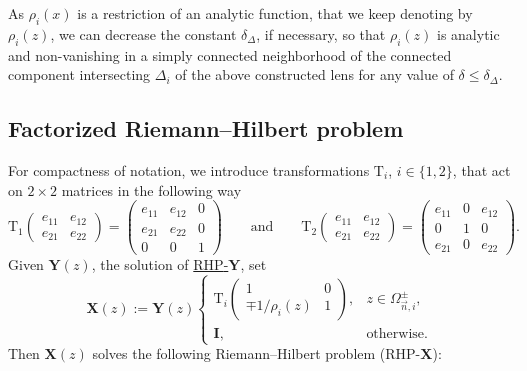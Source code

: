 \documentclass[pdftex]{sigma}
\numberwithin{equation}{section}
\newcommand{\n}{{\vec n}}
\newcommand{\rhy} {\textnormal{RHP}-${\boldsymbol Y}$}
\newcommand{\rhx} {\textnormal{RHP}-${\boldsymbol X}$}
\begin{document}
As $ \rho_i(x) $ is a restriction of an analytic function, that we keep denoting by $ \rho_i(z) $, we can decrease the constant $ \delta_\Delta $, if necessary, so that $ \rho_i(z) $ is analytic and non-vanishing in a simply connected neighborhood of the connected component intersecting $ \Delta_i $ of the above constructed lens for any value of $ \delta\leq\delta_\Delta $.

\subsection{Factorized Riemann--Hilbert problem}

For compactness of notation, we introduce transformations $\mathrm{T}_i$, $i\in\{1,2\}$, that act on $2\times2$ matrices in the following way
\[
\mathrm{T}_1 \begin{pmatrix} e_{11} & e_{12} \\ e_{21} & e_{22} \end{pmatrix} = \begin{pmatrix} e_{11} & e_{12} & 0 \\ e_{21} & e_{22} & 0 \\ 0 & 0 & 1\end{pmatrix} \qquad \text{and}\qquad  \mathrm{T}_2 \begin{pmatrix} e_{11} & e_{12} \\ e_{21} & e_{22} \end{pmatrix} = \begin{pmatrix} e_{11} & 0 & e_{12} \\ 0 & 1 & 0 \\ e_{21} & 0 & e_{22}\end{pmatrix}.
\]
Given $\boldsymbol Y(z)$, the solution of \hyperref[rhy]{\rhy}, set
\begin{equation}
\label{X}
\boldsymbol X(z):= \boldsymbol Y(z)
\begin{cases}
\mathrm{T}_i \begin{pmatrix} 1 & 0 \\ \mp1/\rho_i(z) & 1 \end{pmatrix}, & z\in \Omega_{\n,i}^{\pm}, \\
\boldsymbol I, & \text{otherwise}.
\end{cases}
\end{equation}
Then $\boldsymbol X(z)$ solves the following Riemann--Hilbert problem (\rhx):
\end{document}
